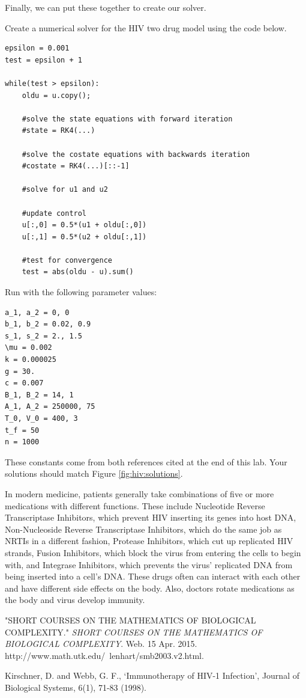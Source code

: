 Finally, we can put these together to create our solver.
\begin{problem}
Create a numerical solver for the HIV two drug model using the code below.

\begin{lstlisting}
epsilon = 0.001
test = epsilon + 1

while(test > epsilon):
	oldu = u.copy();
    
	#solve the state equations with forward iteration
	#state = RK4(...)
    
	#solve the costate equations with backwards iteration
	#costate = RK4(...)[::-1]
	
	#solve for u1 and u2
    
	#update control
	u[:,0] = 0.5*(u1 + oldu[:,0])
	u[:,1] = 0.5*(u2 + oldu[:,1])

	#test for convergence
	test = abs(oldu - u).sum()
\end{lstlisting}

Run with the following parameter values:
\begin{lstlisting}
a_1, a_2 = 0, 0
b_1, b_2 = 0.02, 0.9
s_1, s_2 = 2., 1.5
\mu = 0.002
k = 0.000025
g = 30.
c = 0.007
B_1, B_2 = 14, 1
A_1, A_2 = 250000, 75
T_0, V_0 = 400, 3
t_f = 50
n = 1000
\end{lstlisting}
These constants come from both references cited at the end of this lab. Your solutions should match Figure \ref{fig:hiv:solutions}.
\label{problem:hiv:solver}

\label{problem:hiv:numericalsolver}
\end{problem}

In modern medicine, patients generally take combinations of five or more medications with different functions. These include Nucleotide Reverse Transcriptase Inhibitors, which prevent HIV inserting its genes into host DNA, Non-Nucleoside Reverse Transcriptase Inhibitors, which do the same job as NRTIs in a different fashion, Protease Inhibitors, which cut up replicated HIV strands, Fusion Inhibitors, which block the virus from entering the cells to begin with, and Integrase Inhibitors, which prevents the virus' replicated DNA from being inserted into a cell's DNA. These drugs often can interact with each other and have different side effects on the body. Also, doctors rotate medications as the body and virus develop immunity. 

\begin{thebibliography}{9}

"SHORT COURSES ON THE MATHEMATICS OF BIOLOGICAL COMPLEXITY." \textit{SHORT COURSES ON THE MATHEMATICS OF BIOLOGICAL COMPLEXITY}. Web. 15 Apr. 2015. http://www.math.utk.edu/~lenhart/smb2003.v2.html.

Kirschner, D. and Webb, G. F., `Immunotherapy of HIV-1 Infection', Journal of Biological Systems, 6(1), 71-83 (1998).
\end{thebibliography}


